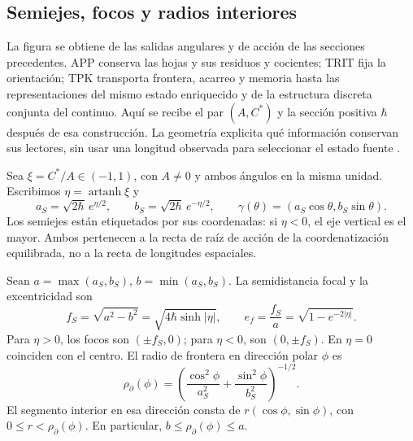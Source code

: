 
\subsection{Semiejes, focos y radios interiores}
\label{sec:ii-elipse-geometria}

La figura se obtiene de las salidas angulares y de acción de las secciones
precedentes. APP conserva las hojas y sus residuos y cocientes; TRIT fija
la orientación; TPK transporta frontera, acarreo y memoria hasta las
representaciones del mismo estado enriquecido y de la estructura discreta
conjunta del continuo. Aquí se recibe el par \((A,C^*)\) y la sección
positiva \(\hbar\) después de esa construcción. La geometría explicita
qué información conservan sus lectores, sin usar una longitud observada
para seleccionar el estado fuente \cite{elipse,hmtedicionintegral}.

Sea \(\xi=C^*/A\in(-1,1)\), con \(A\ne0\) y ambos ángulos en la
misma unidad. Escribimos \(\eta=\operatorname{artanh}\xi\) y
\[
 a_S=\sqrt{2\hbar}\,e^{\eta/2},\qquad
 b_S=\sqrt{2\hbar}\,e^{-\eta/2},\qquad
 \gamma(\theta)=(a_S\cos\theta,b_S\sin\theta).
\]
Los semiejes están etiquetados por sus coordenadas: si \(\eta<0\),
el eje vertical es el mayor. Ambos pertenecen a la recta de raíz de
acción de la coordenatización equilibrada, no a la recta de longitudes espaciales.

\begin{proposition}
\label{prop:ii-elipse-focos}
Sean \(a=\max(a_S,b_S)\), \(b=\min(a_S,b_S)\). La semidistancia
focal y la excentricidad son
\begin{equation}
 f_S=\sqrt{a^2-b^2}
 =\sqrt{4\hbar\sinh|\eta|},\qquad
 e_f=\frac{f_S}{a}=\sqrt{1-e^{-2|\eta|}}.
 \label{eq:ii-elipse-focal}
\end{equation}
Para \(\eta>0\), los focos son \((\pm f_S,0)\); para
\(\eta<0\), son \((0,\pm f_S)\). En \(\eta=0\) coinciden con
el centro. El radio de frontera en dirección polar \(\phi\) es
\begin{equation}
 \rho_{\partial}(\phi)
 =\left(\frac{\cos^2\phi}{a_S^2}
        +\frac{\sin^2\phi}{b_S^2}\right)^{-1/2}.
 \label{eq:ii-elipse-radio-polar}
\end{equation}
El segmento interior en esa dirección consta de
\(r(\cos\phi,\sin\phi)\), con \(0\le r<\rho_{\partial}(\phi)\).
En particular, \(b\le\rho_{\partial}(\phi)\le a\).
\end{proposition}

